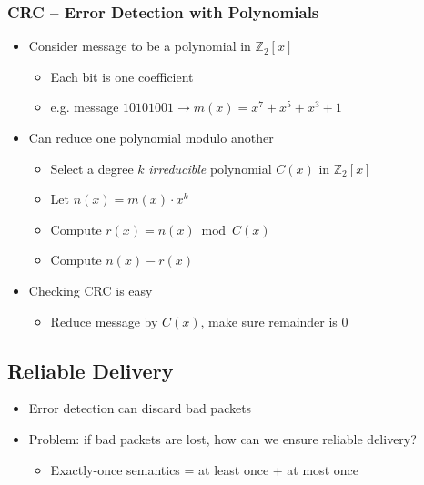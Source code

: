 \subsubsection{CRC -- Error Detection with Polynomials}
\begin{itemize}[nosep]
    \item Consider message to be a polynomial in $\mathbb{Z}_2[x]$
          \begin{itemize}[nosep]
              \item Each bit is one coefficient
              \item e.g. message $10101001 \to m(x) = x^7 + x^5 + x^3 + 1$
          \end{itemize}
    \item Can reduce one polynomial modulo another
          \begin{itemize}[nosep]
              \item Select a degree $k$ \emph{irreducible} polynomial $C(x)$ in $\mathbb{Z}_2[x]$
              \item Let $n(x) = m(x)\cdot x^k$
              \item Compute $r(x) = n(x) \bmod C(x)$
              \item Compute $n(x) - r(x)$
          \end{itemize}
    \item Checking CRC is easy
          \begin{itemize}
              \item Reduce message by $C(x)$, make sure remainder is 0
          \end{itemize}
\end{itemize}
\subsection{Reliable Delivery}
\begin{itemize}
    \item Error detection can discard bad packets
    \item Problem: if bad packets are lost, how can we ensure reliable delivery?
          \begin{itemize}[nosep]
              \item Exactly-once semantics = at least once + at most once
          \end{itemize}
\end{itemize}

